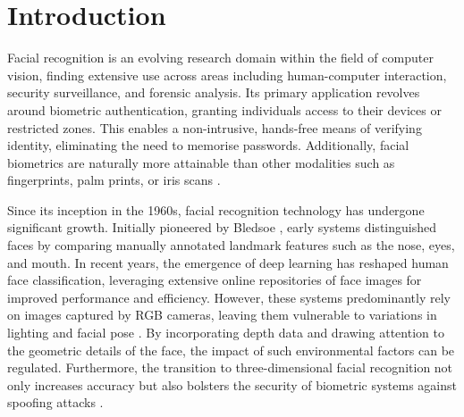 \documentclass{mpaper}
\begin{document}
\section{Introduction}
Facial recognition is an evolving research domain within the field of computer vision, finding extensive use across areas including human-computer interaction, security surveillance, and forensic analysis. Its primary application revolves around biometric authentication, granting individuals access to their devices or restricted zones. This enables a non-intrusive, hands-free means of verifying identity, eliminating the need to memorise passwords. Additionally, facial biometrics are naturally more attainable than other modalities such as fingerprints, palm prints, or iris scans \cite{zhou20183d}.

Since its inception in the 1960s, facial recognition technology has undergone significant growth. Initially pioneered by Bledsoe \cite{bledsoe1966model}, early systems distinguished faces by comparing manually annotated landmark features such as the nose, eyes, and mouth. In recent years, the emergence of deep learning has reshaped human face classification, leveraging extensive online repositories of face images for improved performance and efficiency. However, these systems predominantly rely on images captured by RGB cameras, leaving them vulnerable to variations in lighting and facial pose \cite{xu2004depth}. By incorporating depth data and drawing attention to the geometric details of the face, the impact of such environmental factors can be regulated. Furthermore, the transition to three-dimensional facial recognition not only increases accuracy but also bolsters the security of biometric systems against spoofing attacks \cite{wen2015face}.
\end{document}
